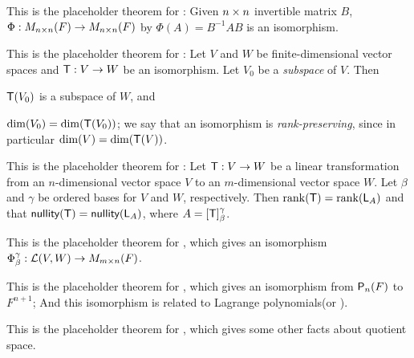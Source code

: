 \begin{additional theorem} \label{athm 2.40}
This is the placeholder theorem for :
Given \(n \times n\) invertible matrix \(B\),
\(\Phi : M_{n \times n}(F) \to M_{n \times n}(F)\) by \(\Phi(A) = B^{-1}AB\) is an isomorphism.
\end{additional theorem}

\begin{additional theorem} \label{athm 2.41}
This is the placeholder theorem for :
Let \(V\) and \(W\) be finite-dimensional vector spaces and \(\textsf{T} : V \to W\) be an isomorphism.
Let \(V_0\) be a \emph{subspace} of \(V\).
Then

 \(\textsf{T}(V_0)\) is a subspace of \(W\), and

 \(\dim(V_0) = \dim(\textsf{T}(V_0))\);
    we say that an isomorphism is \emph{rank-preserving}, since in particular \(\dim(V) = \dim(\textsf{T}(V))\).
\end{additional theorem}

\begin{additional theorem} \label{athm 2.42}
This is the placeholder theorem for :
Let \(\textsf{T}: V \to W\) be a linear transformation from an \(n\)-dimensional vector space \(V\) to an \(m\)-dimensional vector space \(W\).
Let \(\beta\) and \(\gamma\) be ordered bases for \(V\) and \(W\), respectively.
Then \(\mathrm{rank}(\textsf{T}) = \mathrm{rank}(\textsf{L}_A)\) and that \(\textsf{nullity}(\textsf{T}) = \textsf{nullity}(\textsf{L}_A)\), where \(A = [\textsf{T}]_{\beta}^{\gamma}\).
\end{additional theorem}

\begin{additional theorem} \label{athm 2.43}
This is the placeholder theorem for , which gives an isomorphism \(\Phi_{\beta}^{\gamma} : \mathcal{L}(V, W) \to M_{m \times n}(F)\).
\end{additional theorem}

\begin{additional theorem} \label{athm 2.44}
This is the placeholder theorem for , which gives an isomorphism from \(\textsf{P}_n(F)\) to \(F^{n + 1}\);
And this isomorphism is related to Lagrange polynomials(or ).
\end{additional theorem}

\begin{additional theorem} \label{athm 2.45}
This is the placeholder theorem for , which gives some other facts about quotient space.
\end{additional theorem}